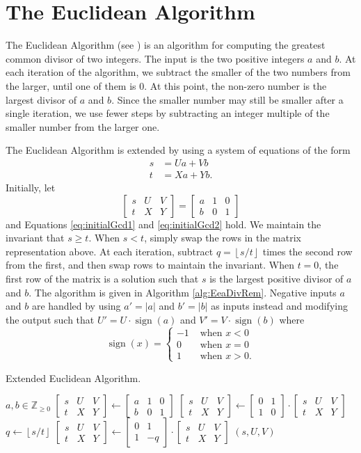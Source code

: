 \documentclass{ucalgthes1}
\theoremstyle{definition}
\DeclareMathOperator{\sign}{sign}
\newcommand{\ZZgez}{\mathbb{Z}_{\ge 0}}
\newcommand{\matrixtt}[4]{\left[ \begin{array}{rr} #1 & #2 \\ #3 & #4 \end{array} \right]}
\newcommand{\matrixThreeTwo}[6]{\left[ \begin{array}{rrr} #1 & #2 & #3 \\ #4 & #5 & #6 \end{array} \right]}
\newcommand{\floor}[1]{\left\lfloor #1 \right\rfloor}
\begin{document}
\section{The Euclidean Algorithm}
\label{sec:gcdEEA}

The Euclidean Algorithm (see \cite[\S 9.3.2]{Cohen2006}) is an algorithm for computing the greatest common divisor of two integers.  The input is the two positive integers $a$ and $b$.  At each iteration of the algorithm, we subtract the smaller of the two numbers from the larger, until one of them is 0. At this point, the non-zero number is the largest divisor of $a$ and $b$.  Since the smaller number may still be smaller after a single iteration, we use fewer steps by subtracting an integer multiple of the smaller number from the larger one.

The Euclidean Algorithm is extended by using a system of equations of the form
\begin{align}
s &= Ua + Vb \label{eq:initialGcd1} \\
t &= Xa + Yb. \label{eq:initialGcd2}
\end{align}
Initially, let
\[
\matrixThreeTwo{s}{U}{V}{t}{X}{Y} = \matrixThreeTwo{a}{1}{0}{b}{0}{1}
\]
and Equations \ref{eq:initialGcd1} and \ref{eq:initialGcd2} hold.  We maintain the invariant that $s \ge t$.  When $s < t$, simply swap the rows in the matrix representation above.  At each iteration, subtract $q = \floor{s/t}$ times the second row from the first, and then swap rows to maintain the invariant.  When $t=0$, the first row of the matrix is a solution such that $s$ is the largest positive divisor of $a$ and $b$.  The algorithm is given in Algorithm \ref{alg:EeaDivRem}.  Negative inputs $a$ and $b$ are handled by using $a' = |a|$ and $b' = |b|$ as inputs instead and modifying the output such that $U' = U \cdot \sign(a)$ and $V' = V \cdot \sign(b)$ where
\[
	\sign(x) = \begin{cases}
		-1 & \textrm{ when } x < 0 \\
		0 & \textrm{ when } x = 0 \\
		1 & \textrm{ when } x > 0.
	\end{cases}
\]

\begin{algorithm}[htb]
\caption{Extended Euclidean Algorithm.}
\label{alg:EeaDivRem}
\begin{algorithmic}[1]
\Require $a,b \in \ZZgez$
\State $\matrixThreeTwo{s}{U}{V}{t}{X}{Y} \gets 
        \matrixThreeTwo{a}{1}{0}{b}{0}{1}$
	\State $\matrixThreeTwo{s}{U}{V}{t}{X}{Y} \gets
	        \matrixtt{0}{1}{1}{0} \cdot \matrixThreeTwo{s}{U}{V}{t}{X}{Y}$
\EndIf
{}
	\State $q \gets \floor{s / t}$
	\State $\matrixThreeTwo{s}{U}{V}{t}{X}{Y} \gets \matrixtt{0}{1}{1}{-q} \cdot
		    \matrixThreeTwo{s}{U}{V}{t}{X}{Y}$ 
\EndWhile
\State \Return $(s, U, V)$ 
\end{algorithmic}
\end{algorithm}
\end{document}
